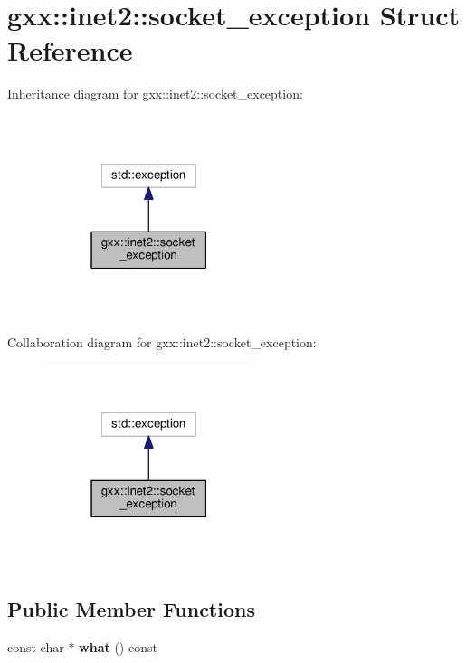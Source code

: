 \hypertarget{structgxx_1_1inet2_1_1socket__exception}{}\section{gxx\+:\+:inet2\+:\+:socket\+\_\+exception Struct Reference}
\label{structgxx_1_1inet2_1_1socket__exception}


Inheritance diagram for gxx\+:\+:inet2\+:\+:socket\+\_\+exception\+:
\nopagebreak
\begin{figure}[H]
\begin{center}
\leavevmode
\includegraphics[width=175pt]{structgxx_1_1inet2_1_1socket__exception__inherit__graph}
\end{center}
\end{figure}


Collaboration diagram for gxx\+:\+:inet2\+:\+:socket\+\_\+exception\+:
\nopagebreak
\begin{figure}[H]
\begin{center}
\leavevmode
\includegraphics[width=175pt]{structgxx_1_1inet2_1_1socket__exception__coll__graph}
\end{center}
\end{figure}
\subsection*{Public Member Functions}
\begin{DoxyCompactItemize}
\item 
const char $\ast$ {\bfseries what} () const \hypertarget{structgxx_1_1inet2_1_1socket__exception_abad33452f673f3e0e4354c539114b5d2}{}\label{structgxx_1_1inet2_1_1socket__exception_abad33452f673f3e0e4354c539114b5d2}

\end{DoxyCompactItemize}
